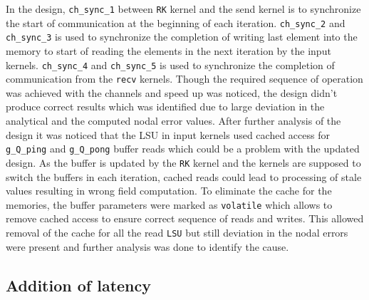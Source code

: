 In the design, \texttt{ch\_sync\_1} between \texttt{RK} kernel and the send kernel is to synchronize
the start of communication at the beginning of each iteration. \texttt{ch\_sync\_2} and
\texttt{ch\_sync\_3} is used to synchronize the completion of writing last element into
the memory to start of reading the elements in the next iteration by the input kernels.
\texttt{ch\_sync\_4} and \texttt{ch\_sync\_5} is used to synchronize the completion
of communication from the \texttt{recv} kernels. Though the required sequence of operation
was achieved with the channels and speed up was noticed, the design didn't produce correct
results which was identified due to large deviation in the analytical and the computed
nodal error values. After further analysis of the design it was noticed that the
\acl{LSU} in input kernels used cached access for \texttt{g\_Q\_ping} and \texttt{g\_Q\_pong}
buffer reads which could be a problem with the updated design. As the buffer is updated by the
\texttt{RK} kernel and the kernels are supposed to switch the buffers in each iteration, cached reads
could lead to processing of stale values resulting in wrong field computation. To eliminate
the cache for the memories, the buffer parameters were marked as \texttt{volatile} which allows
to remove cached access \cite{noauthor_intel_2019,section 9.4} to ensure correct sequence of
reads and writes. This allowed removal
of the cache for all the read \texttt{LSU} but still deviation in the nodal errors were
present and further analysis was done to identify the cause.

\subsection*{Addition of latency}
\label{sec:add_latency}

